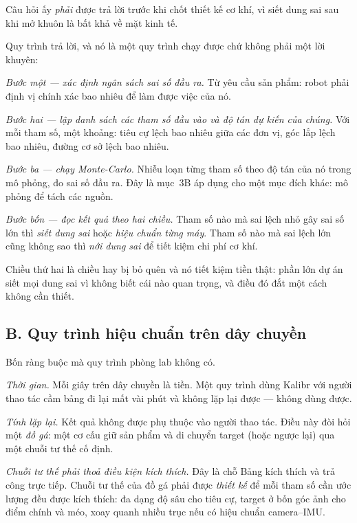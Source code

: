 \documentclass[../../vslam.tex]{subfiles}
\begin{document}
Câu hỏi ấy \emph{phải} được trả lời trước khi chốt thiết kế cơ khí, vì siết dung sai sau khi mở khuôn là bất khả về mặt kinh tế.

Quy trình trả lời, và nó là một quy trình chạy được chứ không phải một lời khuyên:

\emph{Bước một --- xác định ngân sách sai số đầu ra.} Từ yêu cầu sản phẩm: robot phải định vị chính xác bao nhiêu để làm được việc của nó.

\emph{Bước hai --- lập danh sách các tham số đầu vào và độ tán dự kiến của chúng.} Với mỗi tham số, một khoảng: tiêu cự lệch bao nhiêu giữa các đơn vị, góc lắp lệch bao nhiêu, đường cơ sở lệch bao nhiêu.

\emph{Bước ba --- chạy Monte-Carlo.} Nhiễu loạn từng tham số theo độ tán của nó trong mô phỏng, đo sai số đầu ra. Đây là  mục~3B áp dụng cho một mục đích khác: mô phỏng để tách các nguồn.

\emph{Bước bốn --- đọc kết quả theo hai chiều.} Tham số nào mà sai lệch nhỏ gây sai số lớn thì \emph{siết dung sai} hoặc \emph{hiệu chuẩn từng máy}. Tham số nào mà sai lệch lớn cũng không sao thì \emph{nới dung sai} để tiết kiệm chi phí cơ khí.

Chiều thứ hai là chiều hay bị bỏ quên và nó tiết kiệm tiền thật: phần lớn dự án siết mọi dung sai vì không biết cái nào quan trọng, và điều đó đắt một cách không cần thiết.

\subsection{B. Quy trình hiệu chuẩn trên dây chuyền}

Bốn ràng buộc mà quy trình phòng lab không có.

\emph{Thời gian.} Mỗi giây trên dây chuyền là tiền. Một quy trình dùng Kalibr với người thao tác cầm bảng đi lại mất vài phút và không lặp lại được --- không dùng được.

\emph{Tính lặp lại.} Kết quả không được phụ thuộc vào người thao tác. Điều này đòi hỏi một \emph{đồ gá}: một cơ cấu giữ sản phẩm và di chuyển target (hoặc ngược lại) qua một chuỗi tư thế cố định.

\emph{Chuỗi tư thế phải thoả điều kiện kích thích.} Đây là chỗ  Bảng kích thích và  trả công trực tiếp. Chuỗi tư thế của đồ gá phải được \emph{thiết kế} để mỗi tham số cần ước lượng đều được kích thích: đa dạng độ sâu cho tiêu cự, target ở bốn góc ảnh cho điểm chính và méo, xoay quanh nhiều trục nếu có hiệu chuẩn camera--IMU.
\end{document}

